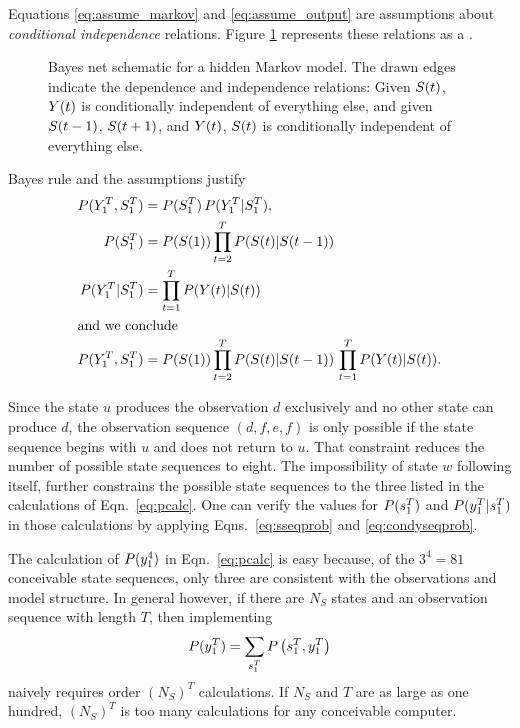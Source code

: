 Equations \eqref{eq:assume_markov} and \eqref{eq:assume_output} are
assumptions about \emph{conditional independence} relations.  Figure
\ref{fig:dhmm_net} represents these relations as a %
\emph{}\cite{Pearl91a}.

\begin{figure}[htbp]
  \centering{\plotsize%
    }
  \caption[Bayes net schematic for a hidden Markov model.]%
  {Bayes net schematic for a hidden Markov model.  The drawn edges
    indicate the dependence and independence relations: Given
    ${S}{(t)}$, ${Y}{(t)}$ is conditionally independent of
    everything else, and given ${S}{(t-1)}$, ${S}{(t+1)}$, and
    ${Y}{(t)}$, ${S}{(t)}$ is conditionally independent of
    everything else.}
  \label{fig:dhmm_net}
\end{figure}

Bayes rule and the assumptions justify
\begin{align}
  P(\ts{Y}{1}{T},\ts{S}{1}{T}) &= P(\ts{S}{1}{T}) \, %
                                   P(\ts{Y}{1}{T}|\ts{S}{1}{T}),\notag\\
  \label{eq:sseqprob}%
  P(\ts{S}{1}{T})              &= P(\ti{S}{1}) %
                                   \prod_{t=2}^T P(\ti{S}{t}|\ti{S}{t-1})\\
  \label{eq:condyseqprob}%
  P(\ts{Y}{1}{T}|\ts{S}{1}{T}) &= \prod_{t=1}^T P(\ti{Y}{t}|\ti{S}{t})\\
  \intertext{and we conclude}
  P(\ts{Y}{1}{T},\ts{S}{1}{T}) &= P(\ti{S}{1}) %
                                   \prod_{t=2}^T P(\ti{S}{t}|\ti{S}{t-1})\, %
                                   \prod_{t=1}^T P(\ti{Y}{t}|\ti{S}{t}).\notag
\end{align}

Since the state $u$ produces the observation $d$ exclusively and no
other state can produce $d$, the observation sequence $(d,f,e,f)$ is
only possible if the state sequence begins with $u$ and does not
return to $u$.  That constraint reduces the number of possible state
sequences to eight.  The impossibility of state $w$ following itself,
further constrains the possible state sequences to the three listed in
the calculations of Eqn.~\eqref{eq:pcalc}.  One can verify the values
for $P(s_{1}^{T})$ and $P(y_{1}^{T}|s_{1}^{T})$ in those
calculations by applying Eqns.~\eqref{eq:sseqprob} and
\eqref{eq:condyseqprob}.

The calculation of $P(y_{1}^{4})$ in Eqn.~\eqref{eq:pcalc} is easy
because, of the $3^4 = 81$ conceivable state sequences, only three are
consistent with the observations and model structure.  In general
however, if there are $N_S$ states and an observation sequence with
length $T$, then implementing
\begin{equation*}
  P(y_{1}^{T}) = \sum_{s_{1}^{T}} P\left(s_{1}^{T}
    ,y_{1}^{T} \right)
\end{equation*}
naively requires order $\left(N_S\right)^T$ calculations.  If $N_S$
and $T$ are as large as one hundred, $\left(N_S\right)^T$ is too many
calculations for any conceivable computer.

